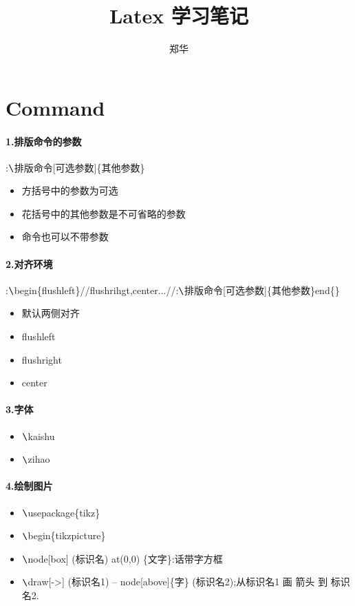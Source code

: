 \documentclass[UTF8,a4paper,8pt]{ctexart}
\author{郑华}
\title{Latex 学习笔记}
\begin{document}
 	\maketitle
 
 \section*{Command}
 
  \paragraph{1.排版命令的参数}:$ \verb|\|$排版命令[可选参数]\{其他参数\}
  
	  \begin{itemize}
	  	\item 方括号中的参数为可选
	  	\item 花括号中的其他参数是不可省略的参数
	  	\item 命令也可以不带参数
	  \end{itemize}
   \paragraph{2.对齐环境}:$ \verb|\|$begin\{flushleft\}//flushrihgt,center...//:$ \verb|\|$排版命令[可选参数]\{其他参数\}end\{\}
	    \begin{itemize}
	    	\item 默认两侧对齐
	    	\item flushleft
	    	\item flushright
	    	\item center
	    \end{itemize}
	\paragraph{3.字体}
		\begin{itemize}
			\item \kaishu $ \verb|\|$kaishu
			\item {} $ \verb|\|$zihao
		\end{itemize}
		
    \paragraph{4.绘制图片}
	    \begin{itemize}
	    	\item $ \verb|\|$usepackage\{tikz\}
	    	\item $ \verb|\|$begin\{tikzpicture\}
	    	\item $ \verb|\|$node[box] (标识名) at(0,0) \{文字\}:话带字方框
	    	\item $ \verb|\|$draw[->] (标识名1) -- node[above]\{字\} (标识名2);从标识名1 画 箭头 到 标识名2.
	    \end{itemize}
	    
\end{document}
